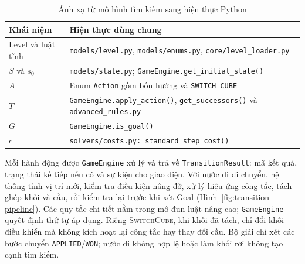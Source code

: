 \begin{table}[H]
\centering
\caption{Ánh xạ từ mô hình tìm kiếm sang hiện thực Python}
\label{tab:model-code-map}
\small
\begin{tabularx}{\textwidth}{@{}lX@{}}
\toprule
\textbf{Khái niệm} & \textbf{Hiện thực dùng chung} \\
\midrule
Level và luật tĩnh & \texttt{models/level.py}, \texttt{models/enums.py}, \texttt{core/level\_loader.py} \\
$S$ và $s_0$ & \texttt{models/state.py}; \texttt{GameEngine.get\_initial\_state()} \\
$A$ & Enum \texttt{Action} gồm bốn hướng và \texttt{SWITCH\_CUBE} \\
$T$ & \texttt{GameEngine.apply\_action()}, \texttt{get\_successors()} và \texttt{advanced\_rules.py} \\
$G$ & \texttt{GameEngine.is\_goal()} \\
$c$ & \texttt{solvers/costs.py: standard\_step\_cost()} \\
\bottomrule
\end{tabularx}
\end{table}

Mỗi hành động được \texttt{GameEngine} xử lý và trả về \texttt{TransitionResult}:
mã kết quả, trạng thái kế tiếp nếu có và sự kiện cho giao diện. Với nước đi di
chuyển, hệ thống tính vị trí mới, kiểm tra điều kiện nâng đỡ, xử lý hiệu ứng
công tắc, tách--ghép khối và cầu, rồi kiểm tra lại trước khi xét Goal
(Hình~\ref{fig:transition-pipeline}). Các quy tắc chi tiết nằm trong mô-đun
luật nâng cao; \texttt{GameEngine} quyết định thứ tự áp dụng. Riêng
\textsc{SwitchCube}, khi khối đã tách, chỉ đổi khối điều khiển mà không kích
hoạt lại công tắc hay thay đổi cầu. Bộ giải chỉ xét các bước chuyển
\texttt{APPLIED}/\texttt{WON}; nước đi không hợp lệ hoặc làm khối rơi không tạo
cạnh tìm kiếm.

